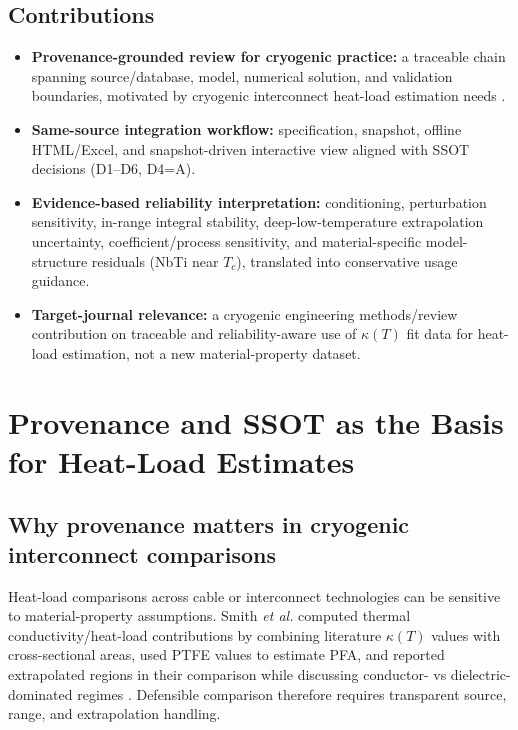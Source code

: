 \documentclass[11pt,a4paper]{article}
\begin{document}
\subsection{Contributions}
\begin{itemize}[leftmargin=*]
\item \textbf{Provenance-grounded review for cryogenic practice:} a traceable chain spanning source/database, model, numerical solution, and validation boundaries, motivated by cryogenic interconnect heat-load estimation needs \cite{smith2024,raicu2025}.
\item \textbf{Same-source integration workflow:} specification, snapshot, offline HTML/Excel, and snapshot-driven interactive view aligned with SSOT decisions (D1--D6, D4=A).
\item \textbf{Evidence-based reliability interpretation:} conditioning, perturbation sensitivity, in-range integral stability, deep-low-temperature extrapolation uncertainty, coefficient/process sensitivity, and material-specific model-structure residuals (NbTi near $T_c$), translated into conservative usage guidance.
\item \textbf{Target-journal relevance:} a cryogenic engineering methods/review contribution on traceable and reliability-aware use of $\kappa(T)$ fit data for heat-load estimation, not a new material-property dataset.
\end{itemize}

\section{Provenance and SSOT as the Basis for Heat-Load Estimates}
\subsection{Why provenance matters in cryogenic interconnect comparisons}
Heat-load comparisons across cable or interconnect technologies can be sensitive to material-property assumptions. Smith \textit{et al.} computed thermal conductivity/heat-load contributions by combining literature $\kappa(T)$ values with cross-sectional areas, used PTFE values to estimate PFA, and reported extrapolated regions in their comparison while discussing conductor- vs dielectric-dominated regimes \cite{smith2024}. Defensible comparison therefore requires transparent source, range, and extrapolation handling.
\end{document}
